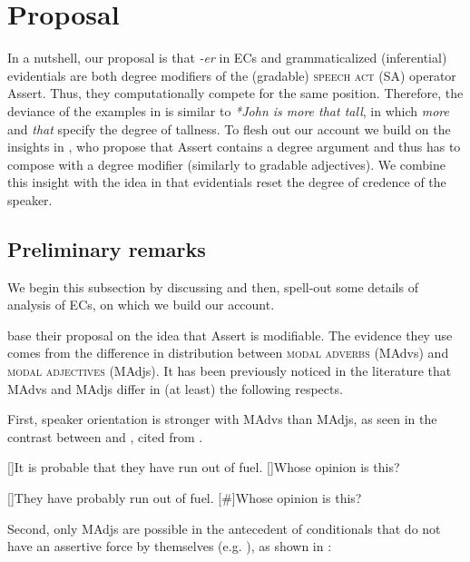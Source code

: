 \documentclass[output=paper,
]{langscibook}
\begin{document}
\section{Proposal}\label{proposal}
In a nutshell, our proposal is that \textit{-er} in ECs and grammaticalized (inferential) evidentials are both degree modifiers of the (gradable) \textsc{speech act} (SA) operator Assert. Thus, they computationally compete for the same position. Therefore, the deviance of the examples in  is similar to \textit{*John is more that tall}, in which \textit{more} and  \textit{that} specify the degree of tallness. To flesh out our account we build on  the insights in \citet{grewol17}, who propose that  Assert contains a degree argument and thus has to compose with a degree modifier (similarly to gradable adjectives). We combine this insight with the idea in \citet{davetal07} that evidentials reset the degree of credence of the speaker. 

\subsection{Preliminary remarks} \label{PrelimRem}
We begin this subsection by discussing 
\citet{grewol17} and then, spell-out some details of  analysis of ECs, on which we build our account.

\citet{grewol17} base their proposal on the idea that Assert is modifiable. The evidence they use comes from the difference in distribution between \textsc{modal adverbs} (MAdvs) and \textsc{modal adjectives} (MAdjs). It has been previously noticed in the literature that MAdvs and MAdjs differ in (at least) the following respects.  
 
 First, speaker orientation is stronger with MAdvs than MAdjs, as seen in the contrast between  and , cited from \citet{grewol17}. 
 
 	\ea \label{madven} 
 	\ea\label{madvena}
 	\begin{xlist}
 	{It is probable that they have run out of fuel.}
 	{Whose opinion is this?}
    \end{xlist}
		\ex\label{madvenb}
	\begin{xlist}
	[]{They have probably run out of fuel.}
	[\#]{Whose opinion is this?}
			\end{xlist}
            \z\z
 
\noindent Second, only MAdjs are possible in the antecedent of conditionals that do not have an assertive force by themselves (e.g. \citealt{kra91}), as shown in : 
 
\end{document}

